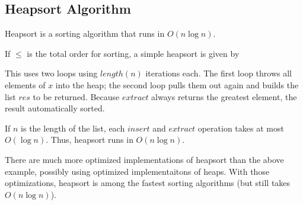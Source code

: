 \subsection{Heapsort Algorithm}\label{sec:ad:heapsort}

Heapsort is a sorting algorithm that runs in $O(n\log n)$.

If $\leq$ is the total order for sorting, a simple heapsort is given by
\begin{acode}
\end{acode}

This uses two loops using $length(n)$ iterations each.
The first loop throws all elements of $x$ into the heap; the second loop pulls them out again and builds the list $res$ to be returned.
Because $extract$ always returns the greatest element, the result automatically sorted.

If $n$ is the length of the list, each $insert$ and $extract$ operation takes at most $O(\log n)$.
Thus, heapsort runs in $O(n\log n)$.
\medskip

There are much more optimized implementations of heapsort than the above example, possibly using optimized implementaitons of heaps.
With those optimizations, heapsort is among the fastest sorting algorithms (but still takes $O(n\log n)$).